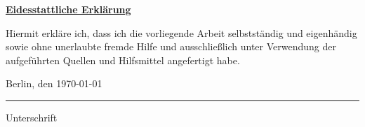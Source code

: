 \thispagestyle{empty}
\begin{LARGE}
	\ul{\textbf{Eidesstattliche Erkl\"arung}}
\end{LARGE}

\vspace{1cm}

Hiermit erkläre ich, dass ich die vorliegende Arbeit selbstständig und eigenhändig sowie ohne
unerlaubte fremde Hilfe und ausschlie\ss lich unter Verwendung der aufgeführten Quellen und Hilfsmittel
angefertigt habe.
\vspace{2cm}

Berlin, den \today

\vspace{1cm}

\rule{0.3\textwidth}{0.4pt}

Unterschrift

\vspace*{6cm}
\newpage
